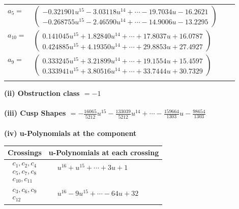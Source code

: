 \documentclass[1p]{elsarticle_modified}
\theoremstyle{definition}
\begin{document}
\begin{tabular}{m{7pt} m{180pt} m{7pt} m{180pt} }
\flushright $a_{5}=$&$\begin{pmatrix}-0.321901 u^{15}-3.03118 u^{14}+\cdots-19.7034 u-16.2621\\-0.268755 u^{15}-2.46590 u^{14}+\cdots-14.9006 u-13.2295\end{pmatrix}$ \\
\flushright $a_{10}=$&$\begin{pmatrix}0.141045 u^{15}+1.82840 u^{14}+\cdots+17.8037 u+16.0787\\0.424885 u^{15}+4.19350 u^{14}+\cdots+29.8853 u+27.4927\end{pmatrix}$ \\
\flushright $a_{9}=$&$\begin{pmatrix}0.333245 u^{15}+3.21899 u^{14}+\cdots+19.1554 u+15.4597\\0.333941 u^{15}+3.80516 u^{14}+\cdots+33.7444 u+30.7329\end{pmatrix}$\\&\end{tabular}
\flushleft \textbf{(ii) Obstruction class $= -1$}\\~\\
\flushleft \textbf{(iii) Cusp Shapes $= -\frac{16065}{5212} u^{15}-\frac{133039}{5212} u^{14}+\cdots-\frac{159664}{1303} u-\frac{98654}{1303}$}\\~\\
\newpage\renewcommand{\arraystretch}{1}
\flushleft \textbf{(iv) u-Polynomials at the component}\newline \\
\begin{tabular}{m{50pt}|m{274pt}}
Crossings & \hspace{64pt}u-Polynomials at each crossing \\
\hline $$\begin{aligned}c_{1},c_{2},c_{4}\\c_{5},c_{7},c_{8}\\c_{10},c_{11}\end{aligned}$$&$\begin{aligned}
&u^{16}+u^{15}+\cdots+3 u+1
\end{aligned}$\\
\hline $$\begin{aligned}c_{3},c_{6},c_{9}\\c_{12}\end{aligned}$$&$\begin{aligned}
&u^{16}-9 u^{15}+\cdots-64 u+32
\end{aligned}$\\
\hline
\end{tabular}\\~\\
\end{document}
